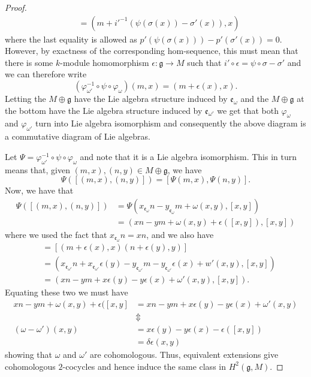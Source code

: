 \begin{proof}
\begin{align*}
                                                                    &= (m + i'^{-1}(\psi(\sigma(x)) - \sigma'(x)),x)
  \end{align*}
  where the last equality is allowed as $ p'(\psi(\sigma(x)))-p'(\sigma'(x)) =0$. However, by exactness of the corresponding hom-sequence, this must mean that there is some $ k $-module homomorphism $ \epsilon: \mathfrak{g} \to M$ such that $ i'\circ \epsilon = \psi\circ \sigma - \sigma' $ and we can therefore write
  \begin{equation}
    (\varphi_{\omega'}^{-1} \circ \psi \circ \varphi_{\omega})(m,x) = (m + \epsilon(x), x).
  \end{equation}
  Letting the $ M \oplus \mathfrak{g} $ have the Lie algebra structure induced by $ \mathfrak{e}_{\omega} $ and the $ M \oplus \mathfrak{g} $ at the bottom have the Lie algebra structure induced by $ \mathfrak{e}_{\omega'} $ we get that both $ \varphi_\omega $ and $ \varphi_{\omega'} $ turn into Lie algebra isomorphism and consequently the above diagram is a commutative diagram of Lie algebras.

  Let $ \Psi = \varphi_{\omega'}^{-1} \circ \psi \circ \varphi_\omega $ and note that it is a Lie algebra isomorphism. This in turn means that, given $ (m,x),(n,y) \in M\oplus \mathfrak{g} $, we have
  \begin{equation}
    \Psi([(m, x), (n,y)]) = [\Psi(m, x), \Psi(n, y)].
  \end{equation}
  Now, we have that
  \begin{align*}
    \Psi([(m, x), (n, y)]) &= \Psi(x_{\mathfrak{e}_\omega}n - y_{\mathfrak{e}_\omega}m + \omega(x,y), [x,y]) \\
                           &= (xn - ym + \omega(x,y) + \epsilon([x,y]), [x,y])
  \end{align*}
  where we used the fact that $ x_{\mathfrak{e}_\omega}n = xn $, and we also have
  \begin{align*}
    [\Psi(m, x), \Psi(n, y)] &= [(m + \epsilon(x),x) (n + \epsilon(y), y)] \\
                             &= (x_{\mathfrak{e}_{\omega'}}n + x_{\mathfrak{e}_{\omega'}}\epsilon(y) - y_{\mathfrak{e}_{\omega'}}m - y_{\mathfrak{e}_{\omega'}}\epsilon(x) + w'(x,y), [x,y])\\
                             &= (xn -ym +x\epsilon(y) - y\epsilon(x) + \omega'(x,y), [x,y]).
  \end{align*}
  Equating these two we must have
  \begin{align*}
    xn - ym + \omega(x,y) + \epsilon([x,y] &= xn -ym +x\epsilon(y) - y\epsilon(x) + \omega'(x,y)\\
                                                     &\Updownarrow \\
    (\omega - \omega')(x,y)&= x\epsilon(y) - y\epsilon(x) - \epsilon([x,y]) \\
                           &= \delta \epsilon(x,y)
  \end{align*}
  showing that $ \omega $ and $ \omega' $ are cohomologous. Thus, equivalent extensions give cohomologous $ 2 $-cocycles and hence induce the same class in $ H^2(\mathfrak{g}, M) $.
\end{proof}

